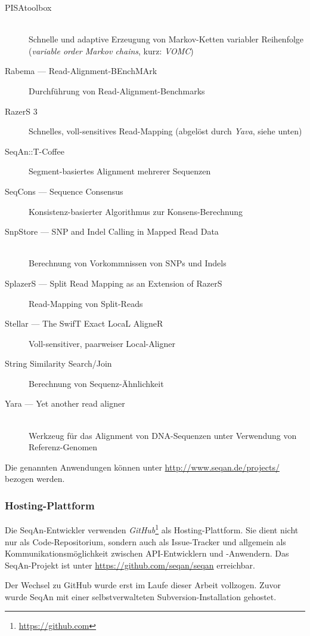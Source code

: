 \begin{description}
  \item[PISAtoolbox] \hfill \\ Schnelle und adaptive Erzeugung von Markov-Ketten variabler Reihenfolge (\textit{variable order Markov chains}, kurz: \textit{VOMC})
  \item[Rabema --- Read-Alignment-BEnchMArk] Durchführung von Read-Alignment-Benchmarks
  \item[RazerS 3] Schnelles, voll-sensitives Read-Mapping (abgelöst durch \textit{Yava}, siehe unten)
  \item[SeqAn::T-Coffee] Segment-basiertes Alignment mehrerer Sequenzen
  \item[SeqCons --- Sequence Consensus] Konsistenz-basierter Algorithmus zur Konsens-Berechnung
  \item[SnpStore --- SNP and Indel Calling in Mapped Read Data] \hfill \\ Berechnung von Vorkommnissen von SNPs und Indels 
  \item[SplazerS --- Split Read Mapping as an Extension of RazerS] Read-Mapping von Split-Reads
  \item[Stellar --- The SwifT Exact LocaL AligneR] Voll-sensitiver, paarweiser Local-Aligner
  \item[String Similarity Search/Join] Berechnung von Sequenz-Ähnlichkeit
  \item[Yara --- Yet another read aligner] \hfill \\ Werkzeug für das Alignment von DNA-Sequenzen unter Verwendung von Referenz-Genomen
\end{description}

Die genannten Anwendungen können unter \url{http://www.seqan.de/projects/} bezogen werden.

\subsubsection{Hosting-Plattform}
Die SeqAn-Entwickler verwenden \textit{GitHub}\footnote{\url{https://github.com}} als Hosting-Plattform. Sie dient nicht nur als Code-Repositorium, sondern auch als Issue-Tracker und allgemein als Kommunikationsmöglichkeit zwischen API-Entwicklern und -Anwendern. Das SeqAn-Projekt ist unter \url{https://github.com/seqan/seqan} erreichbar.

Der Wechsel zu GitHub wurde erst im Laufe dieser Arbeit vollzogen. Zuvor wurde SeqAn mit einer selbstverwalteten Subversion-Installation gehostet.



